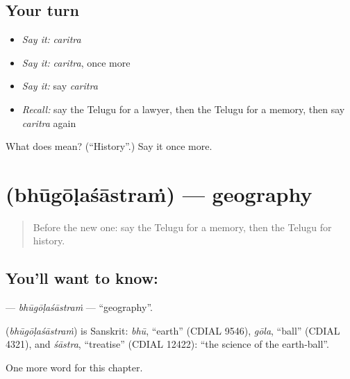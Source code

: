 \subsection*{Your turn}
\begin{itemize}
\raggedright
  \item \emph{Say it:} \emph{caritra}
  \item \emph{Say it:} \emph{caritra}, once more
  \item \emph{Say it:} say \emph{caritra}
  \item \emph{Recall:} say the Telugu for a lawyer, then the Telugu for a memory, then say \emph{caritra} again
\end{itemize}

\begin{tcolorbox}[breakable,colback=teal!4,colframe=teal!35!black,title={Before you move on}]
What does  mean? (\textquotedblleft{}History\textquotedblright{}.) Say it once more.
\end{tcolorbox}
\section[\texorpdfstring{\te{భూగోళశాస్త్రం} (bhūgōḷaśāstraṁ)}{భూగోళశాస్త్రం (bhūgōḷaśāstraṁ)}]{ (bhūgōḷaśāstraṁ) — geography}

\label{lesson:TE-C238-bhugolasastram}



\begin{quote}
Before the new one: say the Telugu for a memory, then the Telugu for history.
\end{quote}

\subsection*{You'll want to know: }
\textbf{} — \emph{bhūgōḷaśāstraṁ} — \textquotedblleft{}geography\textquotedblright{}.

\begin{cousinweb}
\textbf{} (\emph{bhūgōḷaśāstraṁ}) is Sanskrit: \emph{bhū}, \textquotedblleft{}earth\textquotedblright{} (CDIAL 9546), \emph{gōla}, \textquotedblleft{}ball\textquotedblright{} (CDIAL 4321), and \emph{śāstra}, \textquotedblleft{}treatise\textquotedblright{} (CDIAL 12422): \textquotedblleft{}the science of the earth-ball\textquotedblright{}.
\end{cousinweb}

\begin{grammarlens}[title={What you've built}]
One more word for this chapter.
\end{grammarlens}


